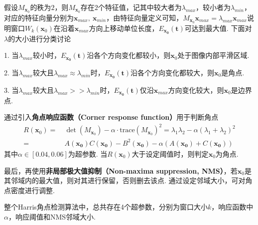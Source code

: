\documentclass[12pt, a4paper, oneside]{ctexart}
\numberwithin{equation}{section}  %
\def\bd{\boldsymbol}        %
\begin{document}
假设$M_{\bd{x}_0}$的秩为$2$，则$M_{\bd{x}_0}$存在$2$个特征值，记其中较大者为$\lambda_{max}$，较小者为$\lambda_{min}$，对应的特征向量分别为$\bd{x}_{max},\ \bd{x}_{min}$，由特征向量定义可知，$M_{\bd{x}_0}\bd{x}_{max} = \lambda_{max}\bd{x}_{max}$说明窗口$W_k(\bd{x}_0)$在沿着$\bd{x}_{max}$方向上移动单位长度，$E_{\bd{x_0}}(\bd{t})$可达到最大值. 下面对$\lambda$的大小进行分类讨论

1. 当$\lambda_{max}$较小时，$E_{\bd{x_0}}(\bd{t})$沿各个方向变化都较小，则$\bd{x}_0$处于图像内部平滑区域.

2. 当$\lambda_{max}$较大且$\lambda_{max}\approx\lambda_{min}$时，$E_{\bd{x_0}}(\bd{t})$沿各个方向变化都较大，则$\bd{x}_0$是角点.

3. 当$\lambda_{max}$较大且$\lambda_{max}>>\lambda_{min}$时，$E_{\bd{x_0}}(\bd{t})$仅沿$\bd{x}_{max}$方向变化较大，则$\bd{x}_0$是边界点.

通过引入\textbf{角点响应函数（Corner response function）}用于判断角点
\begin{align*}
    R(\bd{x}_0) =&\ \det(M_{\bd{x}_0}) - \alpha\cdot\text{trace}(M_{\bd{x}_0})^2 = \lambda_1\lambda_2 - \alpha(\lambda_1+\lambda_2)^2\\
    =&\ A(\bd{x_0})C(\bd{x_0}) - B^2(\bd{x_0}) - \alpha(A(\bd{x_0})+C(\bd{x_0}))
\end{align*}
其中$\alpha\in[0.04,0.06]$为超参数. 当$R(\bd{x}_0)$大于设定阈值时，则判定$\bd{x}_0$为角点.

最后，再使用\textbf{非局部极大值抑制（Non-maxima suppression, NMS）}，若$\bd{x}_0$是其邻域内的最大值，则对其进行保留，否则删去该点. 通过设定邻域大小，可对角点密度进行调整.

整个Harris角点检测算法中，总共存在4个超参数，分别为窗口大小$k$，响应函数中$\alpha$，响应阈值和NMS邻域大小.
\end{document}
